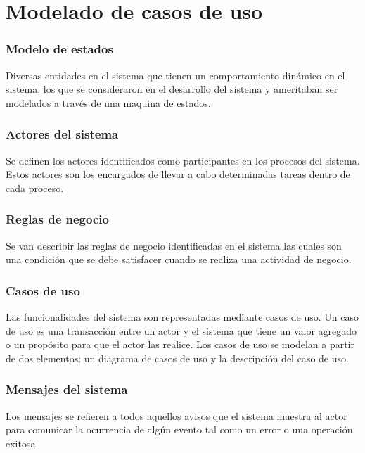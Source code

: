 \section{Modelado de casos de uso}

\subsubsection{Modelo de estados}

Diversas entidades en el sistema  que tienen un comportamiento dinámico en el sistema, 
los que se consideraron en el desarrollo del sistema y ameritaban ser modelados a través de una 
maquina de estados.\\

\subsubsection{Actores del sistema}

 Se definen los actores identificados como participantes en los procesos del sistema. 
 Estos actores son los encargados de llevar a cabo determinadas tareas dentro de cada proceso.\\
 
 \subsubsection{Reglas de negocio}

 Se van describir las reglas de negocio identificadas en el sistema las cuales son una condición que 
 se debe satisfacer cuando se realiza una actividad de negocio.\\
 
\subsubsection{Casos de uso}

Las funcionalidades del sistema son representadas mediante casos de uso. Un caso de uso es una transacción entre un actor y el sistema que tiene un valor agregado o un propósito para que el actor las realice. Los casos de uso se modelan a partir de dos elementos: un diagrama de casos de uso y la
descripción del caso de uso.\\

\subsubsection{Mensajes del sistema}

Los mensajes se refieren a todos aquellos avisos que el sistema muestra al actor para comunicar la ocurrencia de algún evento tal como un error o una operación exitosa. 




